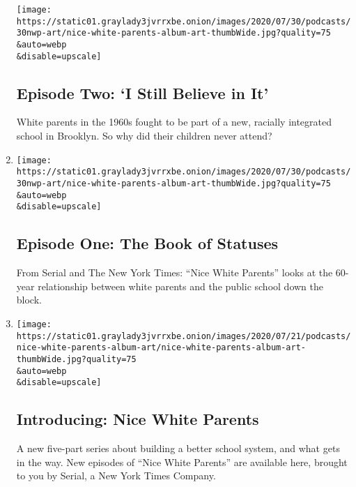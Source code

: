 \begin{enumerate}
  \texttt{[image: https://static01.graylady3jvrrxbe.onion/images/2020/07/30/podcasts/30nwp-art/nice-white-parents-album-art-thumbWide.jpg?quality=75\\\&auto=webp\\\&disable=upscale]}

  \hypertarget{episode-two-i-still-believe-in-it}{%
  \subsection{Episode Two: `I Still Believe in
  It'}\label{episode-two-i-still-believe-in-it}}

  White parents in the 1960s fought to be part of a new, racially
  integrated school in Brooklyn. So why did their children never attend?
\item
  \href{/2020/07/30/podcasts/nice-white-parents-serial.html}{}

  \texttt{[image: https://static01.graylady3jvrrxbe.onion/images/2020/07/30/podcasts/30nwp-art/nice-white-parents-album-art-thumbWide.jpg?quality=75\\\&auto=webp\\\&disable=upscale]}

  \hypertarget{episode-one-the-book-of-statuses}{%
  \subsection{Episode One: The Book of
  Statuses}\label{episode-one-the-book-of-statuses}}

  From Serial and The New York Times: ``Nice White Parents'' looks at
  the 60-year relationship between white parents and the public school
  down the block.
\item
  \href{/2020/07/23/podcasts/nice-white-parents-serial.html}{}

  \texttt{[image: https://static01.graylady3jvrrxbe.onion/images/2020/07/21/podcasts/nice-white-parents-album-art/nice-white-parents-album-art-thumbWide.jpg?quality=75\\\&auto=webp\\\&disable=upscale]}

  \hypertarget{introducing-nice-white-parents}{%
  \subsection{Introducing: Nice White
  Parents}\label{introducing-nice-white-parents}}

  A new five-part series about building a better school system, and what
  gets in the way. New episodes of ``Nice White Parents'' are available
  here, brought to you by Serial, a New York Times Company.
\end{enumerate}

